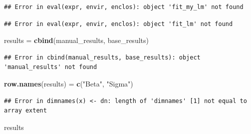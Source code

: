 \documentclass[12pt,]{krantz}
\newenvironment{Shaded}{\begin{snugshade}}{\end{snugshade}}
\newcommand{\KeywordTok}[1]{\textcolor[rgb]{0.27,0.27,0.27}{\textbf{#1}}}
\newcommand{\DecValTok}[1]{\textcolor[rgb]{0.06,0.06,0.06}{#1}}
\newcommand{\StringTok}[1]{\textcolor[rgb]{0.5,0.5,0.5}{#1}}
\newcommand{\OperatorTok}[1]{\textcolor[rgb]{0.43,0.43,0.43}{\textbf{#1}}}
\newcommand{\NormalTok}[1]{#1}
\begin{document}
\begin{verbatim}
## Error in eval(expr, envir, enclos): object 'fit_my_lm' not found
\end{verbatim}

\begin{Shaded}
\end{Shaded}

\begin{verbatim}
## Error in eval(expr, envir, enclos): object 'fit_lm' not found
\end{verbatim}

\begin{Shaded}
\begin{Highlighting}[]
\NormalTok{results =}\StringTok{ }\KeywordTok{cbind}\NormalTok{(manual_results, base_results)}
\end{Highlighting}
\end{Shaded}

\begin{verbatim}
## Error in cbind(manual_results, base_results): object 'manual_results' not found
\end{verbatim}

\begin{Shaded}
\begin{Highlighting}[]
\KeywordTok{row.names}\NormalTok{(results) =}\StringTok{ }\KeywordTok{c}\NormalTok{(}\StringTok{"Beta"}\NormalTok{, }\StringTok{"Sigma"}\NormalTok{)}
\end{Highlighting}
\end{Shaded}

\begin{verbatim}
## Error in dimnames(x) <- dn: length of 'dimnames' [1] not equal to array extent
\end{verbatim}

\begin{Shaded}
\begin{Highlighting}[]
\NormalTok{results}
\end{Highlighting}
\end{Shaded}
\end{document}

